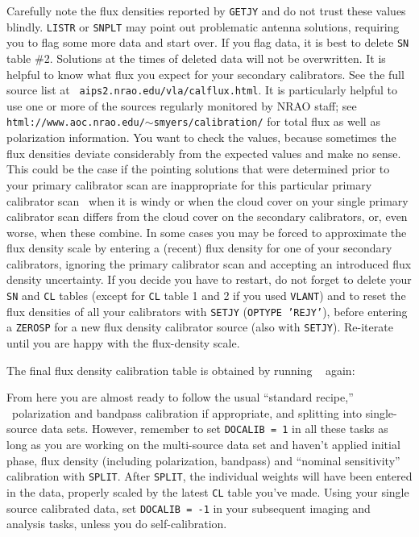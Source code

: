 Carefully note the flux densities reported by {\tt GETJY} and do not
trust these values blindly.  {\tt LISTR} or {\tt SNPLT} may point out
problematic antenna solutions, requiring you to flag some more data and
start over.  If you flag data, it is best to delete {\tt SN} table
\#2.  Solutions at the times of deleted data will not be overwritten.
It is helpful to know what flux you expect for your secondary
calibrators.  See the full source list at {\tt
aips2.nrao.edu/vla/calflux.html}.  It is particularly helpful to use
one or more of the sources regularly monitored by NRAO staff; see {\tt
html://www.aoc.nrao.edu/$\sim$smyers/calibration/} for total flux as
well as polarization information.  You want to check the values,
because sometimes the flux densities deviate considerably from the
expected values and make no sense.  This could be the case if the
pointing solutions that were determined prior to your primary
calibrator scan are inappropriate for this particular primary
calibrator scan \eg\ when it is windy or when the cloud cover on your
single primary calibrator scan differs from the cloud cover on the
secondary calibrators, or, even worse, when these combine. In some
cases you may be forced to approximate the flux density scale by
entering a (recent) flux density for one of your secondary
calibrators, ignoring the primary calibrator scan and accepting an
introduced flux density uncertainty. If you decide you have to
restart, do not forget to delete your {\tt SN} and {\tt CL} tables
(except for {\tt CL} table 1 and 2 if you used {\tt VLANT}) and to
reset the flux densities of all your calibrators with {\tt SETJY}
({\tt OPTYPE 'REJY'}), before entering a {\tt ZEROSP} for a new flux
density calibrator source (also with {\tt SETJY})\@.  Re-iterate until
you are happy with the flux-density scale.

The final flux density calibration table is obtained by running {\tt
{}} again:
\pd

From here you are almost ready to follow the usual ``standard
recipe,'' \ie\ polarization and bandpass calibration if appropriate,
and splitting into single-source data sets.  However, remember to set
{\tt DOCALIB = 1} in all these tasks as long as you are working on the
multi-source data set and haven't applied initial phase, flux density
(including polarization, bandpass) and ``nominal sensitivity''
calibration with {\tt SPLIT}. After {\tt SPLIT}, the individual
weights will have been entered in the data, properly scaled by the
latest {\tt CL} table you've made. Using your single source calibrated
data, set {\tt DOCALIB = -1} in your subsequent imaging and analysis
tasks, unless you do self-calibration.

